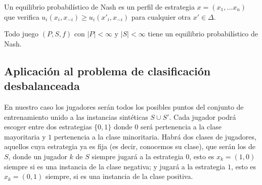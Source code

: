 \begin{definition}
Un equilibrio probabilístico de Nash es un perfil de estrategia $x = (x_1, \ldots x_n)$ que verifica $u_i(x_i, x_{-i}) \ge u_i(x'_{i}, x_{-i})$
para cualquier otra $x'\in \Delta$.
\end{definition}

\begin{theorem}
 Todo juego $(P,S,f)$ con $|P| < \infty$ y $|S| < \infty$ tiene un equilibrio probabilístico de Nash.
\end{theorem}

\subsection{Aplicación al problema de clasificación desbalanceada}
En nuestro caso los jugadores serán todos los posibles puntos del conjunto de entrenamiento unido a las instancias sintéticas $S \cup S'$. Cada
jugador podrá escoger entre dos estrategias $\{0,1\}$ donde $0$ será pertenencia a la clase mayoritaria y $1$ pertenencia a la clase minoritaria.
Habrá dos clases de jugadores, aquellos cuya estrategia ya es fija (es decir, conocemos su clase), que serán los de $S$, donde un jugador $k$ de 
$S$ siempre jugará a la estrategia $0$, esto es $x_k = (1,0)$ siempre si es una instancia de la clase negativa; y jugará a la estrategia $1$, esto es 
$x_k = (0,1)$ siempre, si es una instancia de la clase positiva.

